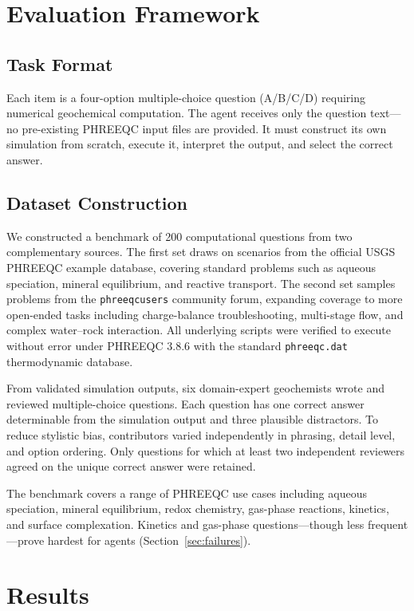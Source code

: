 \documentclass[sigconf,anonymous]{acmart}
\begin{document}
\section{Evaluation Framework}
\label{sec:eval}
\subsection{Task Format}
Each item is a four-option multiple-choice question
(A/B/C/D) requiring numerical geochemical computation.
The agent receives only the question text---no
pre-existing PHREEQC input files are provided.
It must construct its own simulation from scratch,
execute it, interpret the output, and select the
correct answer.

\subsection{Dataset Construction}
We constructed a benchmark of 200 computational
questions from two complementary sources.
The first set draws on scenarios from the official
USGS PHREEQC example database, covering standard
problems such as aqueous speciation, mineral
equilibrium, and reactive transport.
The second set samples problems from the
\texttt{phreeqcusers} community forum, expanding
coverage to more open-ended tasks including
charge-balance troubleshooting, multi-stage flow,
and complex water--rock interaction.
All underlying scripts were verified to execute
without error under PHREEQC 3.8.6 with the
standard \texttt{phreeqc.dat} thermodynamic database.

From validated simulation outputs, six domain-expert
geochemists wrote and reviewed multiple-choice
questions. Each question has one correct answer
determinable from the simulation output and three
plausible distractors. To reduce stylistic bias,
contributors varied independently in phrasing,
detail level, and option ordering. Only questions
for which at least two independent reviewers agreed
on the unique correct answer were retained.

The benchmark covers a range of PHREEQC use cases
including aqueous speciation, mineral equilibrium,
redox chemistry, gas-phase reactions, kinetics,
and surface complexation. Kinetics and gas-phase
questions---though less frequent---prove hardest
for agents (Section~\ref{sec:failures}).

\section{Results}
\label{sec:results}
\end{document}
